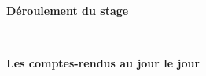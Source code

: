 \documentclass[poly]{valbonne}
\begin{document}


\begin{center}
{\Huge\textbf{Déroulement du stage}}
\end{center}
\vspace{2mm}



\newpage
\thispagestyle{empty}
\mbox{ }

\pagestyle{plain}
\footnotesize
\newcommand{\ssspas}{2.9cm}
\renewcommand{\headrulewidth}{0pt}
\setlength{\tabcolsep}{6pt}
\addtolength{\voffset}{-1.2cm}
\addtolength{\textheight}{2.4cm}
%
%
%

%
%




\graphicspath{{.}}
\renewcommand{\ssspas}{2.7cm}
\addtolength{\voffset}{1.2cm}
\addtolength{\textheight}{-2.4cm}
\normalsize



\begin{center}
{\Huge\textbf{Les comptes-rendus au jour le jour}}
\end{center}
\vspace{2mm}


\vspace{1cm}


\vspace{1cm}


\vspace{1cm}


\vspace{1cm}

%
\vspace{1cm}

%
\vspace{1cm}

%
\vspace{1cm}

%
\vspace{1cm}
\end{document}
